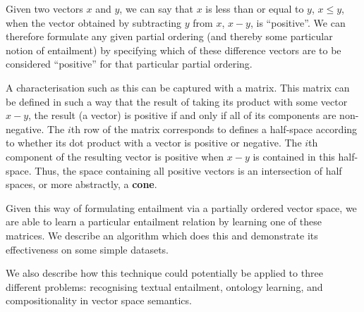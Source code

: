 Given two vectors $x$ and $y$, we can say that $x$ is less than or
equal to $y$, $x\le y$, when the vector obtained by subtracting $y$
from $x$, $x-y$, is ``positive''.  We can therefore formulate any
given partial ordering (and thereby some particular notion of
entailment) by specifying which of these difference vectors are to be
considered ``positive'' for that particular partial ordering.

A characterisation such as this can be captured with a matrix. This
matrix can be defined in such a way that the result of taking its
product with some vector $x-y$, the result (a vector) is positive if
and only if all of its components are non-negative.  The $i$th row of
the matrix corresponds to defines a half-space according to whether
its dot product with a vector is positive or negative. The $i$th
component of the resulting vector is positive when $x-y$ is contained
in this half-space. Thus, the space containing all positive vectors is
an intersection of half spaces, or more abstractly, a \textbf{cone}.

Given this way of formulating entailment via a partially ordered
vector space, we are able to learn a particular entailment relation by
learning one of these matrices. We describe an algorithm which does
this and demonstrate its effectiveness on some simple datasets.

We also describe how this technique could potentially be applied to
three different problems: recognising textual entailment, ontology
learning, and compositionality in vector space semantics. 
